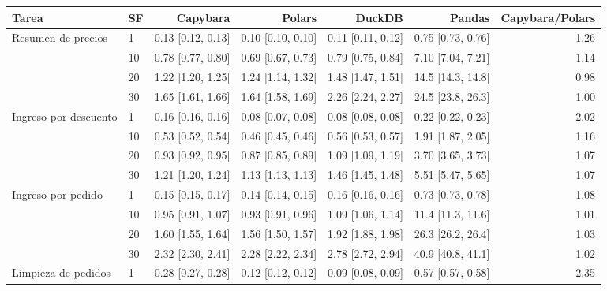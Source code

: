 \begin{tabular}{@{}llrrrrr@{}}
\toprule
Tarea & SF & Capybara & Polars & DuckDB & Pandas & Capybara/Polars \\
\midrule
Resumen de precios & 1 & 0.13 {\scriptsize[0.12, 0.13]} & 0.10 {\scriptsize[0.10, 0.10]} & 0.11 {\scriptsize[0.11, 0.12]} & 0.75 {\scriptsize[0.73, 0.76]} & 1.26 \\
 & 10 & 0.78 {\scriptsize[0.77, 0.80]} & 0.69 {\scriptsize[0.67, 0.73]} & 0.79 {\scriptsize[0.75, 0.84]} & 7.10 {\scriptsize[7.04, 7.21]} & 1.14 \\
 & 20 & 1.22 {\scriptsize[1.20, 1.25]} & 1.24 {\scriptsize[1.14, 1.32]} & 1.48 {\scriptsize[1.47, 1.51]} & 14.5 {\scriptsize[14.3, 14.8]} & 0.98 \\
 & 30 & 1.65 {\scriptsize[1.61, 1.66]} & 1.64 {\scriptsize[1.58, 1.69]} & 2.26 {\scriptsize[2.24, 2.27]} & 24.5 {\scriptsize[23.8, 26.3]} & 1.00 \\
\midrule
Ingreso por descuento & 1 & 0.16 {\scriptsize[0.16, 0.16]} & 0.08 {\scriptsize[0.07, 0.08]} & 0.08 {\scriptsize[0.08, 0.08]} & 0.22 {\scriptsize[0.22, 0.23]} & 2.02 \\
 & 10 & 0.53 {\scriptsize[0.52, 0.54]} & 0.46 {\scriptsize[0.45, 0.46]} & 0.56 {\scriptsize[0.53, 0.57]} & 1.91 {\scriptsize[1.87, 2.05]} & 1.16 \\
 & 20 & 0.93 {\scriptsize[0.92, 0.95]} & 0.87 {\scriptsize[0.85, 0.89]} & 1.09 {\scriptsize[1.09, 1.19]} & 3.70 {\scriptsize[3.65, 3.73]} & 1.07 \\
 & 30 & 1.21 {\scriptsize[1.20, 1.24]} & 1.13 {\scriptsize[1.13, 1.13]} & 1.46 {\scriptsize[1.45, 1.48]} & 5.51 {\scriptsize[5.47, 5.65]} & 1.07 \\
\midrule
Ingreso por pedido & 1 & 0.15 {\scriptsize[0.15, 0.17]} & 0.14 {\scriptsize[0.14, 0.15]} & 0.16 {\scriptsize[0.16, 0.16]} & 0.73 {\scriptsize[0.73, 0.78]} & 1.08 \\
 & 10 & 0.95 {\scriptsize[0.91, 1.07]} & 0.93 {\scriptsize[0.91, 0.96]} & 1.09 {\scriptsize[1.06, 1.14]} & 11.4 {\scriptsize[11.3, 11.6]} & 1.01 \\
 & 20 & 1.60 {\scriptsize[1.55, 1.64]} & 1.56 {\scriptsize[1.50, 1.57]} & 1.92 {\scriptsize[1.88, 1.98]} & 26.3 {\scriptsize[26.2, 26.4]} & 1.03 \\
 & 30 & 2.32 {\scriptsize[2.30, 2.41]} & 2.28 {\scriptsize[2.22, 2.34]} & 2.78 {\scriptsize[2.72, 2.94]} & 40.9 {\scriptsize[40.8, 41.1]} & 1.02 \\
\midrule
Limpieza de pedidos & 1 & 0.28 {\scriptsize[0.27, 0.28]} & 0.12 {\scriptsize[0.12, 0.12]} & 0.09 {\scriptsize[0.08, 0.09]} & 0.57 {\scriptsize[0.57, 0.58]} & 2.35 \\

\end{tabular}
